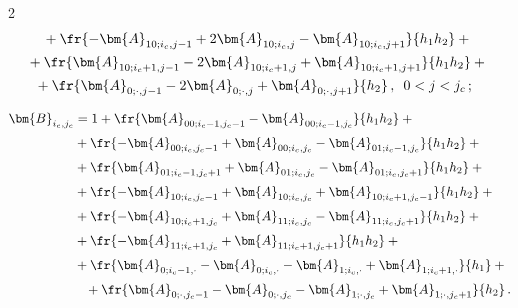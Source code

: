 \begin{multicols}{2}
\begin{align*}
   &\hspace*{3mm}{}+ \fr{ - \bm{A}_{10;i_c,j-1} + 2\bm{A}_{10;i_c,j} - \bm{A}_{10;i_c,j+1}}{h_1h_2} +{}\\


  &\hspace*{-1mm} {}+\fr{ \bm{A}_{10;i_c+1,j-1} - 2\bm{A}_{10;i_c+1,j} + \bm{A}_{10;i_c+1,j+1}}{h_1h_2} +{}\\


&\hspace*{1mm}{}+ \fr{\bm{A}_{0;\cdot,j-1} - 2\bm{A}_{0;\cdot,j} + \bm{A}_{0;\cdot,j+1}}{h_2}\,,\enskip    0<j<j_c\,; 


 \end{align*}


  


 \noindent


  \begin{align*}


  \bm{B}_{i_c,j_c}& =1 + 


  \fr{\bm{A}_{00;i_c-1,j_c-1} - \bm{A}_{00;i_c-1,j_c}}{h_1h_2}+{}\\[2pt]


  &{}+\fr{ - \bm{A}_{00;i_c,j_c-1} + 


\bm{A}_{00;i_c,j_c} - \bm{A}_{01;i_c-1,j_c}}{h_1h_2} +{}\\[2pt]


&{}+ \fr{\bm{A}_{01;i_c-1,j_c+1} + \bm{A}_{01;i_c,j_c} - \bm{A}_{01;i_c,j_c+1}}{h_1h_2}+{}\\[2pt]


&{}+ \fr{ - \bm{A}_{10;i_c,j_c-1} + \bm{A}_{10;i_c,j_c} + \bm{A}_{10;i_c+1,j_c-1}}{h_1h_2}+{}\\[2pt]


&{}+ \fr{ -\bm{A}_{10;i_c+1,j_c} + \bm{A}_{11;i_c,j_c} - \bm{A}_{11;i_c,j_c+1}}{h_1h_2}+{}\\[2pt]


&{}+\fr{ - \bm{A}_{11;i_c+1,j_c} + \bm{A}_{11;i_c+1,j_c+1}}{h_1h_2} + {}\\[2pt]


&{}+\fr{\bm{A}_{0;i_c-1,\cdot} - \bm{A}_{0;i_c, \cdot} - \bm{A}_{1;i_c,\cdot} + \bm{A}_{1;i_c+1,\cdot}}{h_1} + {}\\[2pt]


&\hspace*{3mm}{}+\fr{\bm{A}_{0;\cdot,j_c-1} - \bm{A}_{0;\cdot,j_c} - \bm{A}_{1;\cdot,j_c} + \bm{A}_{1;\cdot,j_c+1}}{h_2}\,. 


  \end{align*}



\end{multicols}
